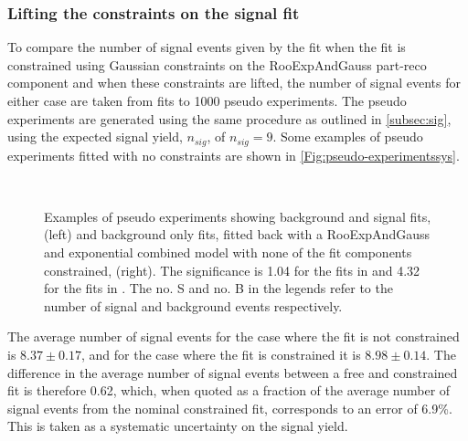 \subsubsection{Lifting the constraints on the signal fit}
\label{sec:rr}
To compare the number of signal events given by the fit when the fit is constrained using Gaussian constraints on the RooExpAndGauss part-reco component and when these constraints are lifted, the number of signal events for either case are taken from fits to 1000 pseudo experiments. The pseudo experiments are generated using the same procedure as outlined in \autoref{subsec:sig}, using the expected signal yield, $n_{sig}$, of $n_{sig} = 9$. Some examples of pseudo experiments fitted with no constraints are shown in \autoref{Fig:pseudo-experimentssys}.
\begin{figure}[h!]
  \def\nh{0.7\textwidth}
  \centering
  \vspace*{-1.5cm}
    \hspace*{-1.5cm}%
     \\
    \hspace*{-1.5cm}
  \caption{Examples of pseudo experiments showing background and signal fits, (left) and background only fits, fitted back with a RooExpAndGauss and exponential combined model with none of the fit components constrained, (right). The significance is 1.04 for the fits in \protect{} and 4.32 for the fits in  \protect{}. The no. S and no. B in the legends refer to the number of signal and background events respectively.}
  \label{Fig:pseudo-experimentssys}
\end{figure}


The average number of signal events for the case where the fit is not constrained is $8.37\pm0.17$, and for the case where the fit is constrained it is $8.98\pm0.14$. The difference in the average number of signal events between a free and constrained fit is therefore 0.62, which, when quoted as a fraction of the average number of signal events from the nominal constrained fit, corresponds to an error of 6.9\%. This is taken as a systematic uncertainty on the \Lbpi signal yield. %

